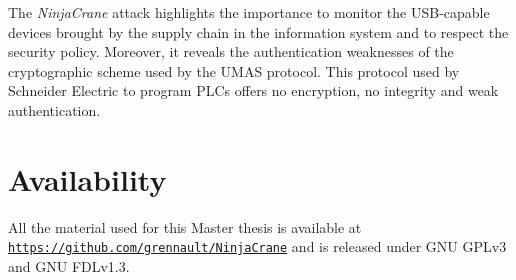The \emph{NinjaCrane} attack highlights the importance to monitor the USB-capable devices brought by the supply chain in the information system and to respect the security policy. Moreover, it reveals the authentication weaknesses of the cryptographic scheme used by the UMAS protocol. This protocol used by Schneider Electric to program PLCs offers no encryption, no integrity and weak authentication.

\newpage
\chapter*{Availability}
All the material used for this Master thesis is available at \href{https://github.com/grennault/NinjaCrane}{\texttt{https://github.com/grennault/NinjaCrane}} and is released under GNU GPLv3 and GNU FDLv1.3.